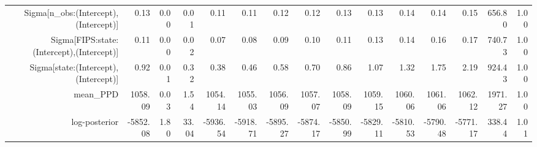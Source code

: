 \begin{table}[ht]
\begin{tabular}{rrrrrrrrrrrrrrr}
  Sigma[n\_obs:(Intercept),(Intercept)] & 0.13 & 0.00 & 0.01 & 0.11 & 0.11 & 0.12 & 0.12 & 0.13 & 0.13 & 0.14 & 0.14 & 0.15 & 656.80 & 1.00 \\ 
  Sigma[FIPS:state:(Intercept),(Intercept)] & 0.11 & 0.00 & 0.02 & 0.07 & 0.08 & 0.09 & 0.10 & 0.11 & 0.13 & 0.14 & 0.16 & 0.17 & 740.73 & 1.00 \\ 
  Sigma[state:(Intercept),(Intercept)] & 0.92 & 0.01 & 0.32 & 0.38 & 0.46 & 0.58 & 0.70 & 0.86 & 1.07 & 1.32 & 1.75 & 2.19 & 924.43 & 1.00 \\ 
  mean\_PPD & 1058.09 & 0.03 & 1.54 & 1054.14 & 1055.03 & 1056.09 & 1057.07 & 1058.09 & 1059.15 & 1060.06 & 1061.06 & 1062.12 & 1971.27 & 1.00 \\ 
  log-posterior & -5852.08 & 1.80 & 33.04 & -5936.54 & -5918.71 & -5895.27 & -5874.17 & -5850.99 & -5829.11 & -5810.53 & -5790.48 & -5771.17 & 338.44 & 1.01 \\ 
   \hline
\end{tabular}
\end{table}
